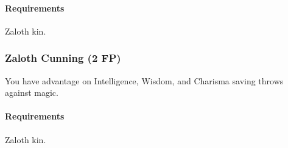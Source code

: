         \paragraph{Requirements} Zaloth kin.
    \subsubsection{Zaloth Cunning (2 FP)} \label{feat::zalothcunning}
        You have advantage on Intelligence, Wisdom, and Charisma saving throws against magic.
        \paragraph{Requirements} Zaloth kin.

\newpage
